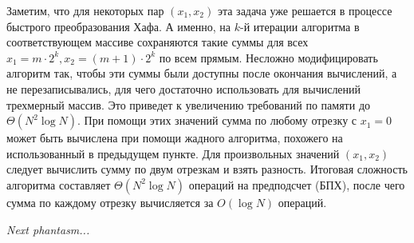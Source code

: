 Заметим, что для некоторых пар $(x_1, x_2)$ эта задача уже решается в процессе быстрого преобразования Хафа. А именно, на $k$-й итерации алгоритма в соответствующем массиве сохраняются такие суммы для всех $x_1 = m \cdot 2^k, x_2 = (m+1) \cdot 2^k$ по всем прямым. Несложно модифицировать алгоритм так, чтобы эти суммы были доступны после окончания вычислений, а не перезаписывались, для чего достаточно использовать для вычислений трехмерный массив. Это приведет к увеличению требований по памяти до $\Theta\left( N^2 \log N \right)$. При помощи этих значений сумма по любому отрезку с $x_1 = 0$ может быть вычислена при помощи жадного алгоритма, похожего на использованный в предыдущем пункте. Для произвольных значений $(x_1, x_2)$ следует вычислить сумму по двум отрезкам и взять разность. Итоговая сложность алгоритма составляет $\Theta\left( N^2 \log N \right)$ операций на предподсчет (БПХ), после чего сумма по каждому отрезку вычисляется за $O\left( \log N \right)$ операций.

\textit{Next phantasm...}
